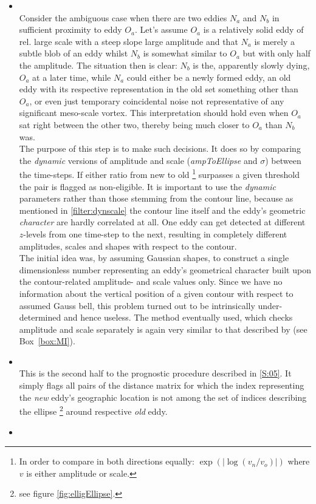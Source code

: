 \begin{itemize}
	\item
	 \\
	 Consider the ambiguous case when there are two eddies $N_a$ and $N_b$ in sufficient proximity to eddy $O_a$. Let's assume $O_a$ is a relatively solid eddy of rel. large scale with a steep slope \ie large amplitude and that $N_a$ is merely a subtle blob of an eddy whilst $N_b$ is somewhat similar to $O_a$ but with only half the amplitude. The situation then is clear: $N_b$ is the, apparently slowly dying, $O_a$ at a later time, while $N_a$ could either be a newly formed eddy, an old eddy with its respective representation in the old set something other than $O_a$, or even just temporary coincidental noise not representative of any significant meso-scale vortex. This interpretation should hold even when $O_a$ sat right between the other two, thereby being much closer to $O_a$ than $N_b$ was.\\
	 The purpose of this step is to make such decisions. It does so by comparing the \textit{dynamic} versions of amplitude and scale (\textit{ampToEllipse} and $\sigma$) between the time-steps. If either ratio from new to old \footnote{In order to compare in both directions equally: $\exp{(\left|\log{(v_n/v_o)}\right|)}$ where $v$ is either amplitude or scale.} surpasses a given threshold the pair is flagged as non-eligible. It is important to use the \textit{dynamic} parameters rather than those stemming from the contour line, because as mentioned  in \ref{filter:dynscale} the contour line itself and the eddy's  geometric \textit{character} are hardly correlated at all. One eddy can get detected at different $z$-levels from one time-step to the next, resulting in completely different amplitudes, scales and shapes with respect to the contour.\\
	The initial idea was, by assuming Gaussian shapes, to construct a single dimensionless number representing an eddy's geometrical character built upon the contour-related amplitude- and scale values only. Since we have no information about the vertical position of a given contour with respect to assumed Gauss bell, this problem turned out to be intrinsically under-determined and hence useless. The method eventually used, which checks amplitude and scale separately is again very similar to that described by \citeauthor{Chelton2011} (see Box~\ref{box:MI}).
	  \item
 \\
This is the second half to the prognostic procedure described in \ref{S:05}. It simply flags all pairs of the distance matrix for which the index representing the \textit{new} eddy's geographic location is not among the set of indices describing the ellipse \footnote{see figure \ref{fig:elligEllipse}.} around respective \textit{old} eddy.
 \item
 \\
\end{itemize}



